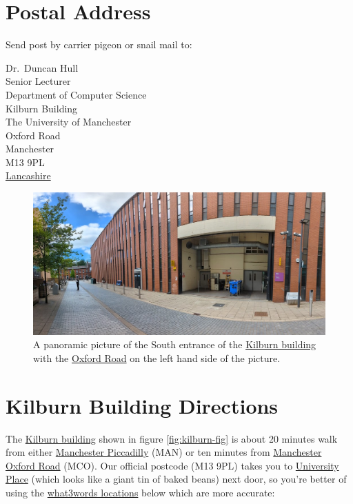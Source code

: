 \documentclass[
  12pt,
]{book}
\begin{document}
\hypertarget{postal}{%
\section{Postal Address}\label{postal}}

Send post by carrier pigeon or snail mail to: 🐌

Dr.~Duncan Hull\\
Senior Lecturer\\
Department of Computer Science\\
Kilburn Building\\
The University of Manchester\\
Oxford Road\\
Manchester\\
M13 9PL\\
\href{https://duncan.hull.name/2019/07/05/mancashire/}{Lancashire} 🌹

\begin{figure}

{\centering \includegraphics[width=1\linewidth]{images/kilburn-south-entrance} 

}

\caption{A panoramic picture of the South entrance of the \href{https://en.wikipedia.org/wiki/Kilburn_Building}{Kilburn building} with the \href{https://en.wikipedia.org/wiki/Wilmslow_Road}{Oxford Road} on the left hand side of the picture.}\label{fig:kilburnsouth-fig}
\end{figure}



\hypertarget{kilburn}{%
\section{Kilburn Building Directions}\label{kilburn}}

The \href{https://en.wikipedia.org/wiki/Kilburn_Building}{Kilburn building} shown in figure \ref{fig:kilburn-fig} is about 20 minutes walk from either \href{https://www.nationalrail.co.uk/stations_destinations/man.aspx}{Manchester Piccadilly} (MAN) or ten minutes from \href{https://www.nationalrail.co.uk/stations/mco/details.aspx}{Manchester Oxford Road} (MCO). Our official postcode (M13 9PL) takes you to \href{http://www.conference.manchester.ac.uk/venues/search/details/?property=10}{University Place} (which looks like a giant tin of baked beans) next door, so you're better of using the \href{https://www.bbc.co.uk/news/uk-england-49319760}{what3words locations} \citep{what3words} below which are more accurate:
\end{document}
